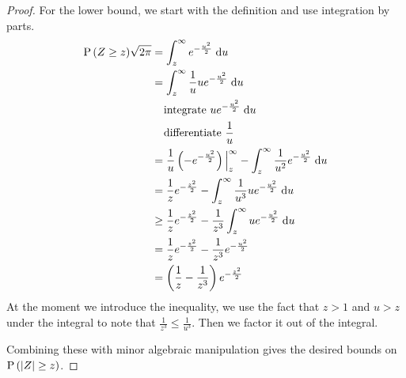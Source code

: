 \documentclass[11pt]{article}
\begin{document}
\begin{proof}
    For the lower bound, we start with the definition and use integration by
    parts.
    \begin{align*}
        \P{Z \geq z} \sqrt{2\pi}
        &= \inttoinf_z e^{-\frac{u^2}{2}} \intd u \\
        &= \inttoinf_z \frac{1}{u} u e^{-\frac{u^2}{2}} \intd u \\
        &\phantom{=}\text{ integrate $ue^{-\frac{u^2}{2}} \intd u$} \\
        &\phantom{=}\text{ differentiate $\frac{1}{u}$} \\
        &= \frac{1}{u}\parens{-e^{-\frac{u^2}{2}}} \evaluated[z]{\infty}
        - \inttoinf_z \frac{1}{u^2} e^{-\frac{u^2}{2}} \intd u \\
        &= \frac{1}{z} e^{-\frac{z^2}{2}}
        - \inttoinf_z \frac{1}{u^3} u e^{-\frac{u^2}{2}} \intd u \\
        &\geq \frac{1}{z} e^{-\frac{z^2}{2}}
        - \frac{1}{z^3} \inttoinf_z u e^{-\frac{u^2}{2}} \intd u \\
        &= \frac{1}{z} e^{-\frac{z^2}{2}} - \frac{1}{z^3} e^{-\frac{u^2}{2}} \\
        &= \parens{\frac{1}{z} - \frac{1}{z^3}} e^{-\frac{z^2}{2}}
    \end{align*}
    At the moment we introduce the inequality, we use the fact that $z > 1$ and
    $u > z$ under the integral to note that $\frac{1}{z^3} \leq \frac{1}{u^3}$.
    Then we factor it out of the integral.

    Combining these with minor algebraic manipulation gives the desired bounds
    on $\operatorname{P}{\left(\left\lvert Z\right\rvert \geq z\right)}$.
\end{proof}
\end{document}
